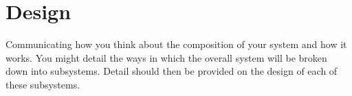 
\chapter{Design}

Communicating how you think about the composition of your system and how it works. You
might detail the ways in which the overall system will be broken down into subsystems. Detail should
then be provided on the design of each of these subsystems.
